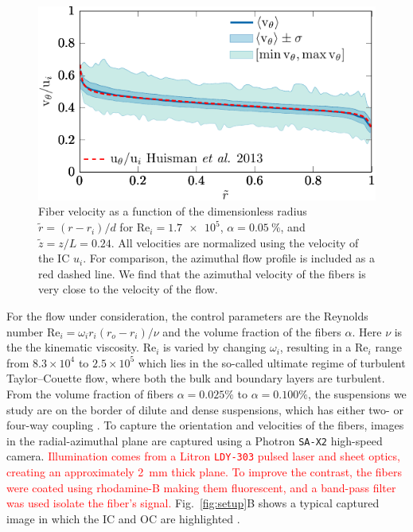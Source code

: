 \documentclass[aps, pre, onecolumn, superscriptaddress,longbibliography]{revtex4-1}
\newcommand{\makered}[1]{\textcolor{red}{#1}}
\begin{document}
\begin{figure}[htp] %
\centering
\includegraphics[scale=1.2]{figure6afibervelocity}
\caption{Fiber velocity as a function of the dimensionless radius
$\tilde{r}=(r-r_i)/d$ for $\text{Re}_i=\num{1.7e5}$, $\alpha =
\SI{0.05}{\percent}$, and $\tilde{z} = z/L = 0.24$. All velocities are
normalized using the velocity of the IC $u_i$. For comparison, the
azimuthal flow profile is included as a red dashed line.  We find that the
azimuthal velocity of the fibers is very close to the velocity of the flow.}
\label{fig:fibervelocity}
\end{figure}
%
For the flow under consideration, the control parameters
are the Reynolds number $\text{Re}_i=\omega_i r_i (r_o - r_i)/\nu$ and the
volume fraction of the fibers $\alpha$. Here $\nu$ is the the kinematic viscosity.  $\text{Re}_i$ is varied by changing $\omega_i$, resulting in a $\text{Re}_i$
range from $8.3 \times 10^4$ to $2.5\times10^5$ which lies in the so-called
ultimate regime \cite{Lathrop1992, vanGils2011, Huisman2012b, Ostilla-Monico2014} of
turbulent Taylor--Couette flow, where both the bulk and boundary layers
are turbulent. From the volume fraction of fibers $\alpha=0.025\%$ to
$\alpha=0.100\%$, the suspensions we study are on the border of dilute and
dense suspensions, which has either two- or four-way coupling
\cite{Elghobashi1994}. 
%
To capture the orientation and velocities of the fibers, images in the
radial-azimuthal plane are captured using a Photron \texttt{SA-X2} high-speed
camera. \makered{Illumination comes from a Litron \texttt{LDY-303} pulsed laser and sheet optics, creating an approximately \SI{2}{\milli\metre} thick plane.
To improve the contrast, the fibers were coated using rhodamine-B making them fluorescent, and a band-pass filter was used isolate the fiber's signal.}
Fig.~\ref{fig:setup}B shows a typical captured image in which the IC and OC are highlighted \citep{Video1, Video2}.
\end{document}
